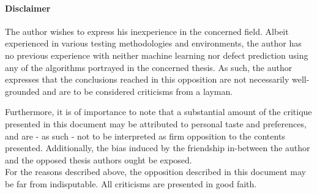 
\paragraph{Disclaimer}
The author wishes to express his inexperience in the concerned field.
Albeit experienced in various testing methodologies and environments, the author has no previous experience with neither machine learning nor defect prediction using any of the algorithms portrayed in the concerned thesis.
As such, the author expresses that the conclusions reached in this opposition are not necessarily well-grounded and are to be considered criticisms from a layman.

Furthermore, it is of importance to note that a substantial amount of the critique presented in this document may be attributed to personal taste and preferences, and are - as such - not to be interpreted as firm opposition to the contents presented.
Additionally, the bias induced by the friendship in-between the author and the opposed thesis authors ought be exposed.\\

\noindent
For the reasons described above, the opposition described in this document may be far from indisputable.
All criticisms are presented in good faith.